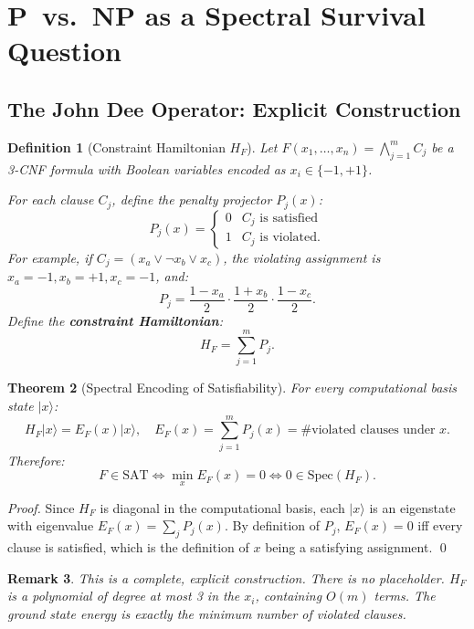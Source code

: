 \documentclass[11pt,letterpaper]{article}
\newtheorem{theorem}{Theorem}[section]
\newtheorem{definition}[theorem]{Definition}
\newtheorem{remark}[theorem]{Remark}
\begin{document}
\section{P~vs.~NP as a Spectral Survival Question}
\label{sec:pnp}

\subsection{The John Dee Operator: Explicit Construction}

\begin{definition}[Constraint Hamiltonian $H_F$]
\label{def:hf}
Let $F(x_1,\ldots,x_n) = \bigwedge_{j=1}^m C_j$ be a 3-CNF formula with
Boolean variables encoded as $x_i \in \{-1, +1\}$.

For each clause $C_j$, define the \emph{penalty projector} $P_j(x)$:
\[
P_j(x) = \begin{cases} 0 & C_j \text{ is satisfied} \\ 1 & C_j \text{ is violated.} \end{cases}
\]
For example, if $C_j = (x_a \lor \neg x_b \lor x_c)$, the violating assignment
is $x_a = -1, x_b = +1, x_c = -1$, and:
\[
P_j = \frac{1-x_a}{2} \cdot \frac{1+x_b}{2} \cdot \frac{1-x_c}{2}.
\]
Define the \textbf{constraint Hamiltonian}:
\[
\boxed{H_F = \sum_{j=1}^{m} P_j.}
\]
\end{definition}

\begin{theorem}[Spectral Encoding of Satisfiability]
\label{thm:spectral}
For every computational basis state $|x\rangle$:
\[
H_F |x\rangle = E_F(x) |x\rangle,
\quad E_F(x) = \sum_{j=1}^m P_j(x) = \text{\# violated clauses under }x.
\]
Therefore:
\[
\boxed{F \in \mathrm{SAT} \iff \min_x E_F(x) = 0 \iff 0 \in \mathrm{Spec}(H_F).}
\]
\end{theorem}
\begin{proof}
Since $H_F$ is diagonal in the computational basis, each $|x\rangle$ is an
eigenstate with eigenvalue $E_F(x) = \sum_j P_j(x)$.  By definition of
$P_j$, $E_F(x) = 0$ iff every clause is satisfied, which is the definition
of $x$ being a satisfying assignment. \qed
\end{proof}

\begin{remark}
This is a complete, explicit construction.  There is no placeholder.
$H_F$ is a polynomial of degree at most 3 in the $x_i$, containing $O(m)$
terms.  The ground state energy is exactly the minimum number of violated
clauses.
\end{remark}
\end{document}
